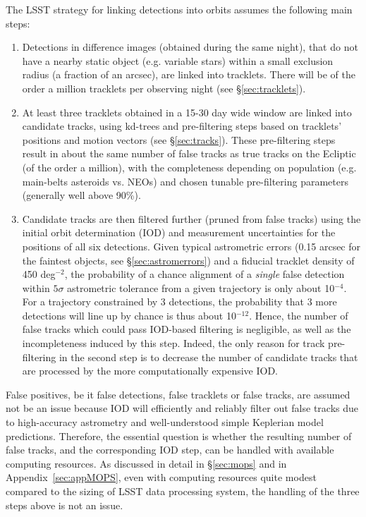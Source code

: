 The LSST strategy for linking detections into orbits assumes the following main steps: 
\begin{enumerate}
\item Detections in difference images (obtained during the same night), that do not
         have a nearby static object (e.g. variable stars) within a small exclusion radius 
         (a fraction of an arcsec), are linked into tracklets. There will be of the order 
         a million tracklets per observing night (see \S\ref{sec:tracklets}). 
\item At least three tracklets obtained in a 15-30 day wide window are linked into 
         candidate tracks, using kd-trees and pre-filtering steps based on tracklets' positions
         and motion vectors (see \S\ref{sec:tracks}). These pre-filtering steps result in 
         about the same number of false tracks as true tracks on the Ecliptic (of the order 
         a million), with the completeness depending on population (e.g. main-belts 
         asteroids vs. NEOs) and chosen tunable pre-filtering parameters (generally well above 90\%). 
\item Candidate tracks are then filtered further (pruned from false tracks) using the initial orbit 
         determination (IOD) and measurement uncertainties for the positions of all six 
         detections. Given typical astrometric errors (0.15 arcsec for the faintest objects, 
         see \S\ref{sec:astromerrors})
         and a fiducial tracklet density of 450 deg$^{-2}$, the probability of a chance alignment 
         of a {\it single} false detection within $5\sigma$ astrometric tolerance from a given 
         trajectory is only about 10$^{-4}$. For a trajectory constrained by 3 detections, the 
         probability that 3 more detections will line up by chance is thus about 10$^{-12}$. Hence, 
         the number of false tracks which could pass IOD-based filtering is negligible, as well as 
         the incompleteness induced by this step. Indeed, the only reason for track pre-filtering 
         in the second step is to decrease the number of candidate tracks that are processed
         by the more computationally expensive IOD. 
\end{enumerate}

False positives, be it false detections, false tracklets or false tracks, are assumed not be 
an issue because IOD will efficiently and reliably filter out false tracks due to high-accuracy 
astrometry and well-understood simple Keplerian model predictions. Therefore, the 
essential question is whether the resulting number of false tracks, and the corresponding
IOD step, can be handled with available computing resources. As discussed in detail in \S\ref{sec:mops}
and in Appendix~\ref{sec:appMOPS}, even with computing resources quite modest compared to the 
sizing of LSST data processing system, the handling of the three steps above is not an issue. 



